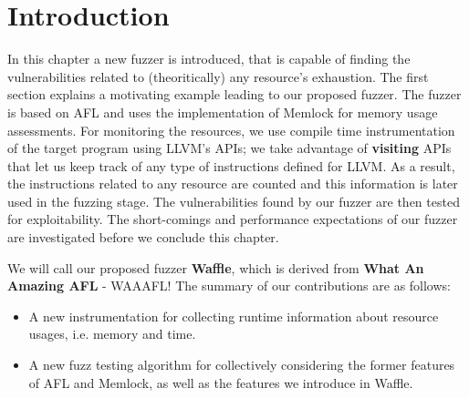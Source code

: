 \section{Introduction}
In this chapter a new fuzzer is introduced, that is capable of finding the vulnerabilities related to (theoritically) any resource's exhaustion. The first section explains a motivating example leading to our proposed fuzzer. The fuzzer is based on AFL and uses the implementation of Memlock for memory usage assessments. For monitoring the resources, we use compile time instrumentation of the target program using LLVM's APIs; we take advantage of \textbf{visiting} APIs that let us keep track of any type of instructions defined for LLVM. As a result, the instructions related to any resource are counted and this information is later used in the fuzzing stage. The vulnerabilities found by our fuzzer are then tested for exploitability. The short-comings and performance expectations of our fuzzer are investigated before we conclude this chapter.

We will call our proposed fuzzer \textbf{Waffle}, which is derived from \textbf{What An Amazing AFL} - WAAAFL! The summary of our contributions are as follows:

\begin{itemize}
    \item A new instrumentation for collecting runtime information about resource usages, i.e. memory and time.
    \item A new fuzz testing algorithm for collectively considering the former features of AFL and Memlock, as well as the features we introduce in Waffle.
\end{itemize}

